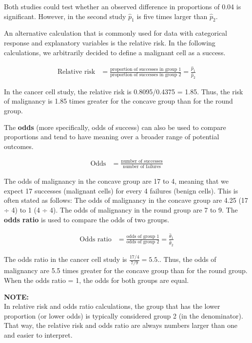 \documentclass[
]{report}
\begin{document}
Both studies could test whether an observed difference in proportions of 0.04 is significant. However, in the second study \emph{\(\hat p_1\)} is five times larger than \emph{\(\hat p_2\)}.

An alternative calculation that is commonly used for data with categorical response and explanatory variables is the relative risk. In the following calculations, we arbitrarily decided to define a malignant cell as a success.

\begin{align}
\text{Relative risk} &= \frac{\text{proportion of successes in group 1}}{\text{proportion of successes in group 2}} = \frac{\hat p_1}{\hat p_2} \tag{6.4}
\end{align}

In the cancer cell study, the relative risk is 0.8095/0.4375 = 1.85. Thus, the risk of malignancy is 1.85 times greater for the concave group than for the round group.

The \textbf{odds} (more specifically, odds of success) can also be used to compare proportions and tend to have meaning over a broader range of potential outcomes.

\begin{align}
\text{Odds} &= \frac{\text{number of successes}}{\text{number of failures}} \tag{6.5}
\end{align}

The odds of malignancy in the concave group are 17 to 4, meaning that we expect 17 successes (malignant cells) for every 4 failures (benign cells). This is often stated as follows: The odds of malignancy in the concave group are 4.25 (17 ÷ 4) to 1 (4 ÷ 4). The odds of malignancy in the round group are 7 to 9. The \textbf{odds ratio} is used to compare the odds of two groups.

\begin{align}
\text{Odds ratio} &= \frac{\text{odds of group 1}}{\text{odds of group 2}} = \frac{\hat\theta_1}{\hat\theta_2} \tag{6.6}
\end{align}

The odds ratio in the cancer cell study is \(\frac{17/4}{7/9} = 5.5.\). Thus, the odds of malignancy are 5.5 times greater for the concave group than for the round group. When the odds ratio = 1, the odds for both groups are equal.

\large

\textbf{NOTE:}\\
In relative risk and odds ratio calculations, the group that has the lower proportion (or lower odds) is typically considered group 2 (in the denominator). That way, the relative risk and odds ratio are always numbers larger than one and easier to interpret.\\
\normalsize
\end{document}
